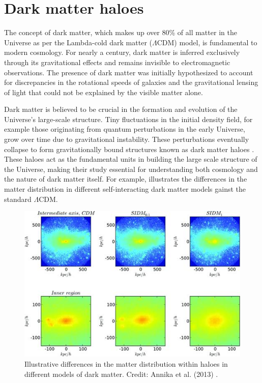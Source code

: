 

\section{Dark matter haloes}

The concept of dark matter, which makes up over 80\% of all matter in the Universe as per the Lambda-cold dark matter ($\Lambda$CDM) model, is fundamental to modern cosmology. For nearly a century, dark matter is inferred exclusively through its gravitational effects and remains invisible to electromagnetic observations. The presence of dark matter was initially hypothesized to account for discrepancies in the rotational speeds of galaxies and the gravitational lensing of light that could not be explained by the visible matter alone.

Dark matter is believed to be crucial in the formation and evolution of the Universe's large-scale structure. Tiny fluctuations in the initial density field, for example those originating from quantum perturbations in the early Universe, grow over time due to gravitational instability. These perturbations eventually collapse to form gravitationally bound structures known as dark matter haloes \citep[][]{1974ApJ...187..425P,2002PhR...372....1C}. These haloes act as the fundamental units in building the large scale structure of the Universe, making their study essential for understanding both cosmology and the nature of dark matter itself. For example,  illustrates the differences in the matter distribution in different self-interacting dark matter models gainst the standard $\Lambda$CDM.

\begin{figure}
    \centering
    \includegraphics[width=0.8\linewidth]{Figures/dm-models-halo-illus.jpeg}
    \caption{Illustrative differences in the matter distribution within haloes in different models of dark matter. Credit: Annika et al. (2013) \citep{2013MNRAS.430..105P}.}
    \label{fig:dm-models-haloes}
\end{figure}

